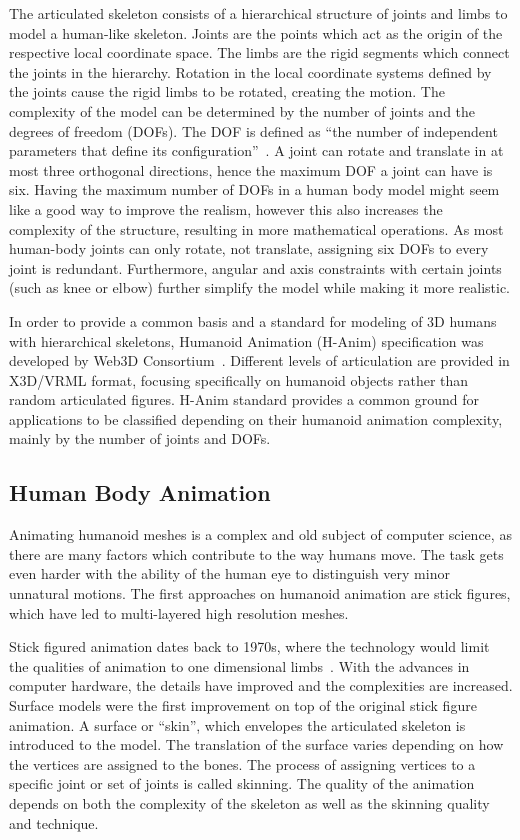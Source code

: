 The articulated skeleton consists of a hierarchical structure of joints and limbs to model a human-like skeleton. Joints are the points which act as the origin of the respective local coordinate space. The limbs are the rigid segments which connect the joints in the hierarchy. Rotation in the local coordinate systems defined by the joints cause the rigid limbs to be rotated, creating the motion. The complexity of the model can be determined by the number of joints and the degrees of freedom (DOFs). The DOF is defined as ``the number of independent parameters that define its configuration''~\cite{Lazard2013}. A joint can rotate and translate in at most three orthogonal directions, hence the maximum DOF a joint can have is six. Having the maximum number of DOFs in a human body model might seem like a good way to improve the realism, 
however this also increases the complexity of the structure, resulting in more mathematical operations. As most human-body joints can only rotate, not translate, assigning six DOFs to every joint is redundant. Furthermore, angular and axis constraints with certain joints (such as knee or elbow) further simplify the model while making it more realistic. 

In order to provide a common basis and a standard for modeling of 3D humans with hierarchical skeletons, Humanoid Animation (H-Anim) specification was developed by Web3D Consortium~\cite{HANIM}. Different levels of articulation are provided in X3D/VRML format, focusing specifically on humanoid objects rather than random articulated figures. H-Anim standard provides a common ground for applications to be classified depending on their humanoid animation complexity, mainly by the number of joints and DOFs. 

\subsection{Human Body Animation}
\label{section_related_human_body_animation}

Animating humanoid meshes is a complex and old subject of computer science, as there are many factors which contribute to the way humans move. The task gets even harder with the ability of the human eye to distinguish very minor unnatural motions. The first approaches on humanoid animation are stick figures, which have led to multi-layered high resolution meshes. 

Stick figured animation dates back to 1970s, where the technology would limit the qualities of animation to one dimensional limbs~\cite{Badler1979}. With the advances in computer hardware, the details have improved and the complexities are increased. Surface models were the first improvement on top of the original stick figure animation. A surface or ``skin'', which envelopes the articulated skeleton is introduced to the model. The translation of the surface varies depending on how the vertices are assigned to the bones. The process of assigning vertices to a specific joint or set of joints is called skinning. The quality of the animation depends on both the complexity of the skeleton as well as the skinning quality and technique. 

